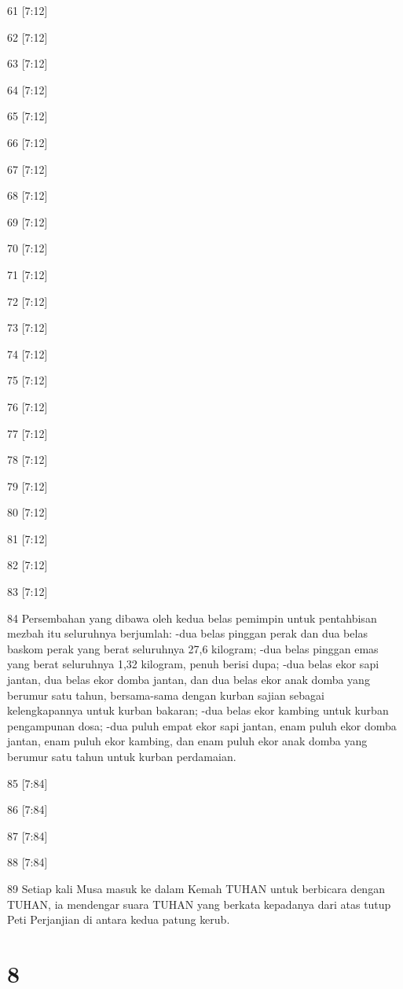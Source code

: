 \par 61 [7:12]
\par 62 [7:12]
\par 63 [7:12]
\par 64 [7:12]
\par 65 [7:12]
\par 66 [7:12]
\par 67 [7:12]
\par 68 [7:12]
\par 69 [7:12]
\par 70 [7:12]
\par 71 [7:12]
\par 72 [7:12]
\par 73 [7:12]
\par 74 [7:12]
\par 75 [7:12]
\par 76 [7:12]
\par 77 [7:12]
\par 78 [7:12]
\par 79 [7:12]
\par 80 [7:12]
\par 81 [7:12]
\par 82 [7:12]
\par 83 [7:12]
\par 84 Persembahan yang dibawa oleh kedua belas pemimpin untuk pentahbisan mezbah itu seluruhnya berjumlah: -dua belas pinggan perak dan dua belas baskom perak yang berat seluruhnya 27,6 kilogram; -dua belas pinggan emas yang berat seluruhnya 1,32 kilogram, penuh berisi dupa; -dua belas ekor sapi jantan, dua belas ekor domba jantan, dan dua belas ekor anak domba yang berumur satu tahun, bersama-sama dengan kurban sajian sebagai kelengkapannya untuk kurban bakaran; -dua belas ekor kambing untuk kurban pengampunan dosa; -dua puluh empat ekor sapi jantan, enam puluh ekor domba jantan, enam puluh ekor kambing, dan enam puluh ekor anak domba yang berumur satu tahun untuk kurban perdamaian.
\par 85 [7:84]
\par 86 [7:84]
\par 87 [7:84]
\par 88 [7:84]
\par 89 Setiap kali Musa masuk ke dalam Kemah TUHAN untuk berbicara dengan TUHAN, ia mendengar suara TUHAN yang berkata kepadanya dari atas tutup Peti Perjanjian di antara kedua patung kerub.

\chapter{8}

